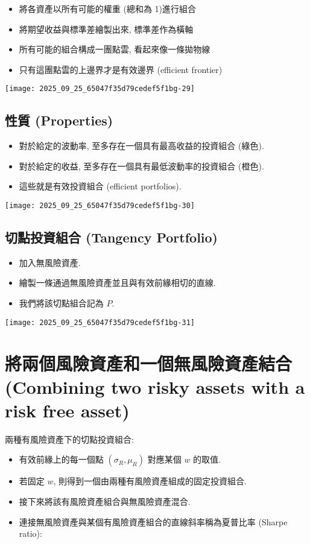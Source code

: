 \documentclass[letterpaper]{article}
\begin{document}
		\begin{itemize}
			\item 將各資產以所有可能的權重 (總和為 1)進行組合
			\item 將期望收益與標準差繪製出來, 標準差作為橫軸
			\item 所有可能的組合構成一團點雲, 看起來像一條拋物線
			\item 只有這團點雲的上邊界才是有效邊界 (efficient frontier)
		\end{itemize}
		
		
		\texttt{[image: 2025\_09\_25\_65047f35d79cedef5f1bg-29]}
		
		\subsection{性質 (Properties)}
		\begin{itemize}
			\item 對於給定的波動率, 至多存在一個具有最高收益的投資組合 (綠色).
			\item 對於給定的收益, 至多存在一個具有最低波動率的投資組合 (橙色).
			\item 這些就是有效投資組合 (efficient portfolios).
		\end{itemize}
		

		\texttt{[image: 2025\_09\_25\_65047f35d79cedef5f1bg-30]}
		
		\subsection{切點投資組合 (Tangency Portfolio)}
		\begin{itemize}
			\item 加入無風險資產.
			\item 繪製一條通過無風險資產並且與有效前緣相切的直線.
			\item 我們將該切點組合記為 $P$.
		\end{itemize}
		
		\texttt{[image: 2025\_09\_25\_65047f35d79cedef5f1bg-31]}
		
		\section{將兩個風險資產和一個無風險資產結合 (Combining two risky assets with a risk free asset)}
		兩種有風險資產下的切點投資組合: 
		
		\begin{itemize}
			\item 有效前緣上的每一個點 $\left (\sigma_{R}, \mu_{R}\right)$ 對應某個 $w$ 的取值.
			\item 若固定 $w$, 則得到一個由兩種有風險資產組成的固定投資組合.
			\item 接下來將該有風險資產組合與無風險資產混合.
			\item 連接無風險資產與某個有風險資產組合的直線斜率稱為夏普比率 (Sharpe ratio):
		\end{itemize}
\end{document}
